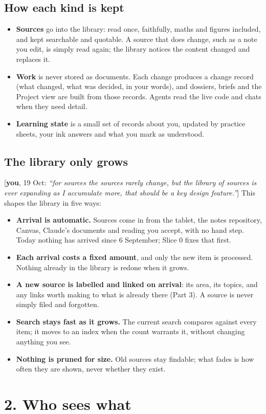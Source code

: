 \documentclass[10pt]{extarticle}
\newcommand{\you}[2]{{\small[\textbf{you}, #1: \textit{``#2''}]}}
\newcommand{\Sec}[1]{\section*{#1}}
\newcommand{\Sub}[1]{\subsection*{#1}}
\begin{document}
\Sub{How each kind is kept}
\begin{itemize}
\item \textbf{Sources} go into the library: read once, faithfully, maths and figures included, and kept searchable and quotable. A source that does change, such as a note you edit, is simply read again; the library notices the content changed and replaces it.
\item \textbf{Work} is never stored as documents. Each change produces a change record (what changed, what was decided, in your words), and dossiers, briefs and the Project view are built from those records. Agents read the live code and chats when they need detail.
\item \textbf{Learning state} is a small set of records about you, updated by practice sheets, your ink answers and what you mark as understood.
\end{itemize}

\Sub{The library only grows}
\you{19 Oct}{for sources the sources rarely change, but the library of sources is ever expanding as I accumulate more, that should be a key design feature.} This shapes the library in five ways:
\begin{itemize}
\item \textbf{Arrival is automatic.} Sources come in from the tablet, the notes repository, Canvas, Claude's documents and reading you accept, with no hand step. Today nothing has arrived since 6 September; Slice 0 fixes that first.
\item \textbf{Each arrival costs a fixed amount}, and only the new item is processed. Nothing already in the library is redone when it grows.
\item \textbf{A new source is labelled and linked on arrival}: its area, its topics, and any links worth making to what is already there (Part 3). A source is never simply filed and forgotten.
\item \textbf{Search stays fast as it grows.} The current search compares against every item; it moves to an index when the count warrants it, without changing anything you see.
\item \textbf{Nothing is pruned for size.} Old sources stay findable; what fades is how often they are shown, never whether they exist.
\end{itemize}

\clearpage
\Sec{2. Who sees what}
\end{document}
